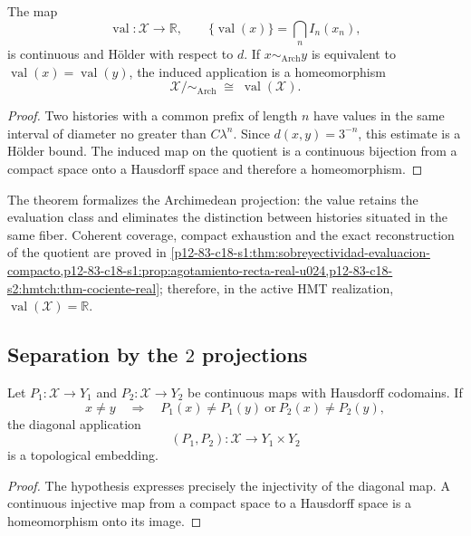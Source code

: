 \begin{theorem}
\label{p12-83-c17-s1:thm:evaluacion-holder}
\label{thm:evaluacion-holder}
The map
\[
 \operatorname{val}:\mathcal X\longrightarrow\mathbb R,
 \qquad
 \{\operatorname{val}(x)\}=\bigcap_n I_n(x_n),
\]
is continuous and Hölder with respect to \(d\). If
\(x\sim_{\mathrm{Arch}}y\) is equivalent to
\(\operatorname{val}(x)=\operatorname{val}(y)\), the induced application
is a homeomorphism
\[
 \mathcal X/{\sim_{\mathrm{Arch}}}
 \;\cong\;\operatorname{val}(\mathcal X).
\]
\end{theorem}

\begin{proof}
Two histories with a common prefix of length \(n\) have values in the
same interval of diameter no greater than \(C\lambda^n\). Since
\(d(x,y)=3^{-n}\), this estimate is a Hölder bound. The induced
map on the quotient is a continuous bijection from a compact space onto
a Hausdorff space and therefore a homeomorphism.
\end{proof}

The theorem formalizes the Archimedean projection: the value retains the evaluation
class and eliminates the distinction between histories situated in the same
fiber. Coherent coverage, compact exhaustion and the
exact reconstruction of the quotient are proved in
\cref{p12-83-c18-s1:thm:sobreyectividad-evaluacion-compacto,p12-83-c18-s1:prop:agotamiento-recta-real-u024,p12-83-c18-s2:hmtch:thm-cociente-real};
therefore, in the active HMT realization,
\(\operatorname{val}(\mathcal X)=\mathbb R\).

\subsection{Separation by the \(2\) projections}

\begin{theorem}
\label{p12-83-c17-s1:thm:separacion-conjunta}
\label{thm:separacion-conjunta}
Let \(P_1:\mathcal X\to Y_1\) and \(P_2:\mathcal X\to Y_2\) be continuous maps
with Hausdorff codomains. If
\[
 x\ne y\quad\Longrightarrow\quad
 P_1(x)\ne P_1(y)\ \text{or}\ P_2(x)\ne P_2(y),
\]
the diagonal application
\[
 (P_1,P_2):\mathcal X\longrightarrow Y_1\times Y_2
\]
is a topological embedding.
\end{theorem}

\begin{proof}
The hypothesis expresses precisely the injectivity of the diagonal map. A
continuous injective map from a compact space to a Hausdorff space is a
homeomorphism onto its image.
\end{proof}

